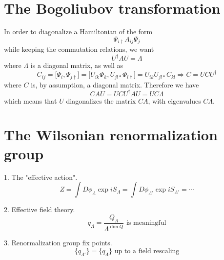 \documentclass[12pt, oneside]{book}
\begin{document}
\section*{The Bogoliubov transformation}
In order to diagonalize a Hamiltonian of the form
\[
\Psi_{i\dagger}A_{ij}\Psi_j
\]
while keeping the commutation relations, we want
\[
U^{\dagger}AU=\Lambda
\]
where $\Lambda$ is a diagonal matrix, as well as
\[
C_{ij}=\big[\Psi_i,\Psi_{j\dagger}\big]=\big[U_{ik}\Phi_k,U_{jl*}\Phi_{l\dagger}\big]=U_{ik}U_{jl*}C_{kl}\Rightarrow
C=UCU^{\dagger}
\]
where $C$ is, by assumption, a diagonal matrix. Therefore we have
\[
CAU=UCU^{\dagger}AU=UC\Lambda
\]
which means that $U$ diagonalizes the matrix $CA$, with eigenvalues $C\Lambda$.

\section*{The Wilsonian renormalization group}
1. The "effective action".
\[
Z=\int D\phi_{\Lambda}\exp{iS_{\Lambda}}=\int D\phi_{\Lambda'}\exp{iS_{\Lambda'}}=\cdots
\]

2. Effective field theory.
\[
\text{$q_{\Lambda}=\frac{Q_{\Lambda}}{\Lambda^{\dim{Q}}}$ is meaningful}
\]

3. Renormalization group fix points.
\[
\text{$\big\{q_{\Lambda'}\big\}=\big\{q_{\Lambda}\big\}$ up to a field rescaling}
\]
\end{document}
